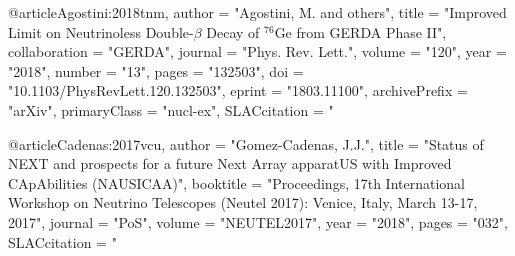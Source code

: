 {{{{{{{{{{{@article{Agostini:2018tnm,
      author         = "Agostini, M. and others",
      title          = "{Improved Limit on Neutrinoless Double-$\beta$ Decay of
                        $^{76}$Ge from GERDA Phase II}",
      collaboration  = "GERDA",
      journal        = "Phys. Rev. Lett.",
      volume         = "120",
      year           = "2018",
      number         = "13",
      pages          = "132503",
      doi            = "10.1103/PhysRevLett.120.132503",
      eprint         = "1803.11100",
      archivePrefix  = "arXiv",
      primaryClass   = "nucl-ex",
      SLACcitation   = "%
}

@article{Cadenas:2017vcu,
      author         = "Gomez-Cadenas, J.J.",
      title          = "{Status of NEXT and prospects for a future Next Array
                        apparatUS with Improved CApAbilities (NAUSICAA)}",
      booktitle      = "{Proceedings, 17th International Workshop on Neutrino
                        Telescopes (Neutel 2017): Venice, Italy, March 13-17,
                        2017}",
      journal        = "PoS",
      volume         = "NEUTEL2017",
      year           = "2018",
      pages          = "032",
      SLACcitation   = "%
}

}}}}}}}}}}}
